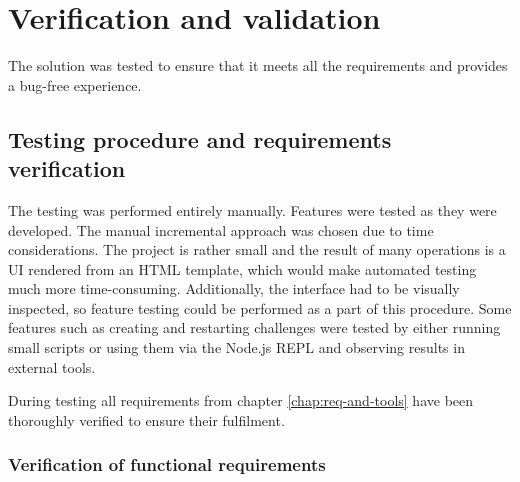 \chapter{Verification and validation}

The solution was tested to ensure that it meets all the requirements and provides a bug-free experience.

\section{Testing procedure and requirements verification}

The testing was performed entirely manually. Features were tested as they were developed. The manual incremental approach was chosen due to time considerations. The project is rather small and the result of many operations is a UI rendered from an HTML template, which would make automated testing much more time-consuming. Additionally, the interface had to be visually inspected, so feature testing could be performed as a part of this procedure. Some features such as creating and restarting challenges were tested by either running small scripts or using them via the Node.js REPL and observing results in external tools.

During testing all requirements from chapter \ref{chap:req-and-tools} have been thoroughly verified to ensure their fulfilment.

\subsection{Verification of functional requirements}

